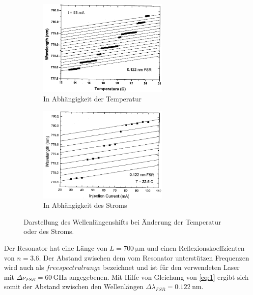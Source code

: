 \begin{figure}
\centering
\begin{subfigure}{.5\textwidth}
	\centering
	\includegraphics[width=0.7\textwidth]{ressources/Temp.png}
	\caption{In Abhängigkeit der Temperatur}
	\label{fig:Theorie1}
\end{subfigure}%
\begin{subfigure}{.5\textwidth}
	\centering
	\includegraphics[width=0.7\textwidth]{ressources/Strom.png}
	\caption{In Abhängigkeit des Stroms}
	\label{fig:Theorie2}
\end{subfigure}
\caption{Darstellung des Wellenlängenshifts bei Änderung der Temperatur oder des Stroms. \cite{skript}}
\label{fig:theo4}
\end{figure}


Der Resonator hat eine Länge von $L=\SI{700}{\micro\meter}$ und einen Reflexionskoeffzienten von $n=3.6$. Der Abstand zwischen dem vom Resonator unterstützen Frequenzen wird auch als $free spectral range$ bezeichnet und ist für den verwendeten Laser mit $\Delta\nu_{FSR}=\SI{60}{\giga\hertz}$ angegebenen. Mit Hilfe von Gleichung von \ref{eq:1} ergibt sich somit der Abstand zwischen den Wellenlängen $\Delta\lambda_{FSR}=\SI{0.122}{\nano\meter}$.

